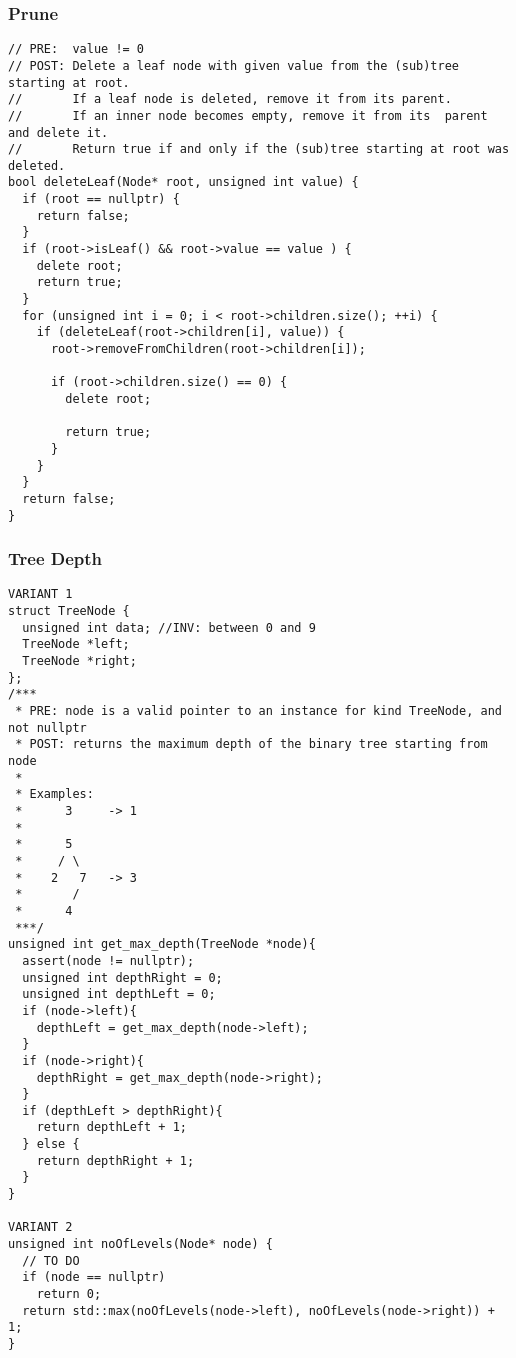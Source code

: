 \subsubsection{Prune}
\begin{lstlisting}[style = codeexpert]
// PRE:  value != 0
// POST: Delete a leaf node with given value from the (sub)tree starting at root.
//       If a leaf node is deleted, remove it from its parent.
//       If an inner node becomes empty, remove it from its  parent and delete it.
//       Return true if and only if the (sub)tree starting at root was deleted.
bool deleteLeaf(Node* root, unsigned int value) {
  if (root == nullptr) {
    return false;
  }
  if (root->isLeaf() && root->value == value ) {
    delete root;
    return true;
  }
  for (unsigned int i = 0; i < root->children.size(); ++i) {
    if (deleteLeaf(root->children[i], value)) {
      root->removeFromChildren(root->children[i]);
      
      if (root->children.size() == 0) {
        delete root;
        
        return true;
      }
    }
  }
  return false;
}
\end{lstlisting}



\subsubsection{Tree Depth}
\begin{lstlisting}[style = codeexpert]
VARIANT 1
struct TreeNode {
  unsigned int data; //INV: between 0 and 9
  TreeNode *left;
  TreeNode *right;
};
/***
 * PRE: node is a valid pointer to an instance for kind TreeNode, and not nullptr
 * POST: returns the maximum depth of the binary tree starting from node
 * 
 * Examples:
 *      3     -> 1
 *
 *      5
 *     / \ 
 *    2   7   -> 3
 *       /
 *      4
 ***/
unsigned int get_max_depth(TreeNode *node){
  assert(node != nullptr);
  unsigned int depthRight = 0;
  unsigned int depthLeft = 0;
  if (node->left){
    depthLeft = get_max_depth(node->left);
  }
  if (node->right){
    depthRight = get_max_depth(node->right);
  }
  if (depthLeft > depthRight){
    return depthLeft + 1;
  } else {
    return depthRight + 1;
  }
}

VARIANT 2
unsigned int noOfLevels(Node* node) {
  // TO DO
  if (node == nullptr)
    return 0;
  return std::max(noOfLevels(node->left), noOfLevels(node->right)) + 1;
}


\end{lstlisting}


